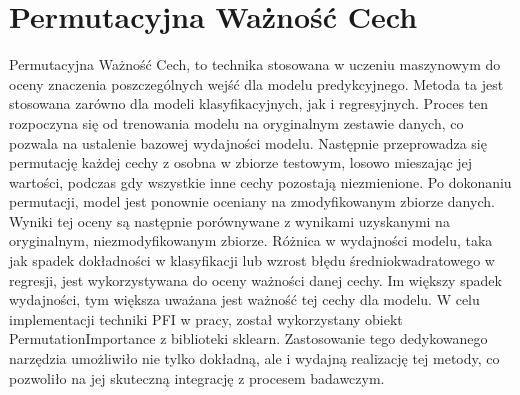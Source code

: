 \documentclass[a4paper,twoside,12pt]{book}
\begin{document}
\section{Permutacyjna Ważność Cech}
Permutacyjna Ważność Cech, to technika stosowana w uczeniu maszynowym do oceny znaczenia poszczególnych wejść dla modelu predykcyjnego. Metoda ta jest stosowana zarówno dla modeli klasyfikacyjnych, jak i regresyjnych. Proces ten rozpoczyna się od trenowania modelu na oryginalnym zestawie danych, co pozwala na ustalenie bazowej wydajności modelu. Następnie przeprowadza się permutację każdej cechy z osobna w zbiorze testowym, losowo mieszając jej wartości, podczas gdy wszystkie inne cechy pozostają niezmienione. Po dokonaniu permutacji, model jest ponownie oceniany na zmodyfikowanym zbiorze danych. Wyniki tej oceny są następnie porównywane z wynikami uzyskanymi na oryginalnym, niezmodyfikowanym zbiorze. Różnica w wydajności modelu, taka jak spadek dokładności w klasyfikacji lub wzrost błędu średniokwadratowego w regresji, jest wykorzystywana do oceny ważności danej cechy. Im większy spadek wydajności, tym większa uważana jest ważność tej cechy dla modelu.
W celu implementacji techniki PFI w pracy, został wykorzystany obiekt PermutationImportance z biblioteki sklearn. Zastosowanie tego dedykowanego narzędzia umożliwiło nie tylko dokładną, ale i wydajną realizację tej metody, co pozwoliło na jej skuteczną integrację z procesem badawczym.
\end{document}
